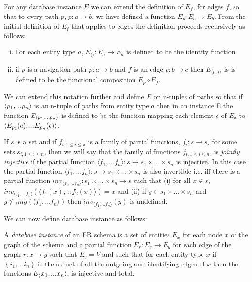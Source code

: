 \documentclass[10pt,a4paper]{article}
\newcommand{\set}[1]{\left\{#1\right\}}
\newcommand{\veee}{v}
\newcommand{\Veee}{V}
\newcommand{\term}[1]{\textit{{#1}}}
\begin{document}
\noindent For any database instance $E$ we can  extend  the definition of
$E_f$, for edges $f$,  so that to every path $p$, $p: a \rightarrow b$,  we have defined a function $E_p: E_a \rightarrow E_b$. From the initial definition of $E_f$ that applies to 
edges the definition proceeds recursively as follows: 
\begin{enumerate} [(i)]
\item{  For each entity type $a$, $E_{\langle \rangle}: E_a \rightarrow E_a$ is defined to be the identity function.
}
\item{   if $p$ is a navigation path $p: a \rightarrow b$ and $f$ is an edge $p: b \rightarrow c$ then $E_{\langle p,f \rangle}$ is 
is defined to be the functional composition $E_p \circ E_f$.
}
\end{enumerate}

We can extend this notation further and define $E$ on n-tuples of paths so that if 
$\langle p_1,...p_n\rangle$ is an n-tuple of paths from entity type $a$ then in an instance E
the function  $E_{\langle p_1,...p_n\rangle}$ is defined to be the function mapping each element $e$ 
of $E_a$ to 
$\langle E_{p_1}(e),...E_{p_n}(e)\rangle$.

\begin{definition}
If $s$ is a set and if $f_{i, 1\leq i \leq n}$ is a family of partial functions, $f_i: s \rightarrow s_i$   for some sets $s_{i, 1 \leq i \leq n}$,  then
we will say that the family of functions $f_{i, 1\leq i \leq n}$, is \term{jointly injective} if the partial function $\langle f_1,...f_n\rangle: s \rightarrow
s_1 \times ... \times s_n $ is injective. In this case the partial function $\langle f_1,...f_n\rangle: s \rightarrow
s_1 \times ... \times s_n $ is also invertible i.e. iff there is a partial function $inv_{\langle f_1,...f_n\rangle} : s_1 \times ... \times s_n \rightarrow s$ such that
(i) for all $x \in s$, $inv_{\langle f_1,...f_n\rangle}(\langle f_1(x),...f_2(x) \rangle ) = x$ and (ii) if $y \in s_1 \times ... \times s_n $ and
$y \notin img(\langle f_1,...f_n\rangle)$ then $inv_{\langle f_1,...f_n\rangle}(y)$ is undefined. \\
\end{definition}

\noindent We can now define database instance as follows:
\begin{definition}
\noindent A \term{database instance}  of an ER schema is
a set of entities $E_x$ for each node $x$ of the graph of the schema and 
a partial function $E_r : E_x \rightarrow E_y$ for each edge of the graph $r:x \rightarrow y$ 
such that $E_\veee=\Veee$
and such that 
for each entity type $x$ if $\set{i_1,...i_n}$ is the subset of all the outgoing and identifying edges
of $x$ then
the functions $E_\langle x_1,...x_n\rangle$, is injective
and total.
\end{definition}
\end{document}
